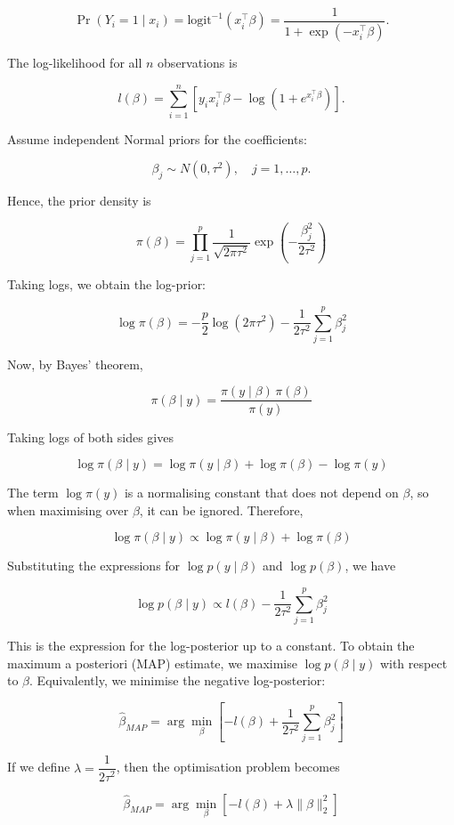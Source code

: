 \documentclass[12pt,halfline,a4paper,]{ouparticle}
\begin{document}
\[\Pr(Y_i = 1 \mid x_i) = \text{logit}^{-1}(x_i^\top \beta) = \dfrac{1}{1 + \exp(-x_i^\top \beta)}.\]

The log-likelihood for all \(n\) observations is

\[l(\beta) = \sum_{i=1}^n \left[ y_i x_i^\top \beta - \log(1 + e^{x_i^\top \beta}) \right].\]

Assume independent Normal priors for the coefficients:

\[\beta_j \sim N(0, \tau^2), \quad j = 1, \ldots, p.\]

Hence, the prior density is

\[\pi(\beta) = \prod_{j=1}^p \dfrac{1}{\sqrt{2\pi\tau^2}}
\exp\!\left(-\dfrac{\beta_j^2}{2\tau^2}\right)\]

Taking logs, we obtain the log-prior:

\[\log \pi(\beta) = -\dfrac{p}{2}\log(2\pi\tau^2)
-\dfrac{1}{2\tau^2}\sum_{j=1}^p \beta_j^2\]

Now, by Bayes' theorem,

\[\pi(\beta \mid y) = \dfrac{\pi(y \mid \beta)\, \pi(\beta)}{\pi(y)}\]

Taking logs of both sides gives

\[\log \pi(\beta \mid y) = \log \pi(y \mid \beta) + \log \pi(\beta) - \log \pi(y)\]

The term \(\log \pi(y)\) is a normalising constant that does not depend
on \(\beta\), so when maximising over \(\beta\), it can be ignored.
Therefore,

\[\log \pi(\beta \mid y) \propto \log \pi(y \mid \beta) + \log \pi(\beta)\]

Substituting the expressions for \(\log p(y \mid \beta)\) and
\(\log p(\beta)\), we have

\[\log p(\beta \mid y) \propto l(\beta) - \dfrac{1}{2\tau^2}\sum_{j=1}^p \beta_j^2\]

This is the expression for the log-posterior up to a constant. \newpage
To obtain the maximum a posteriori (MAP) estimate, we maximise
\(\log p(\beta \mid y)\) with respect to \(\beta\). Equivalently, we
minimise the negative log-posterior:

\[\widehat{\beta}_{MAP} = \arg\min_\beta
\left[ -l(\beta) + \dfrac{1}{2\tau^2}\sum_{j=1}^p \beta_j^2 \right]\]

If we define \(\lambda = \dfrac{1}{2\tau^2}\), then the optimisation
problem becomes

\[\boxed{
\widehat{\beta}_{MAP}
= \arg\min_\beta \left[ -l(\beta) + \lambda \|\beta\|_2^2 \right]
}\]
\end{document}
